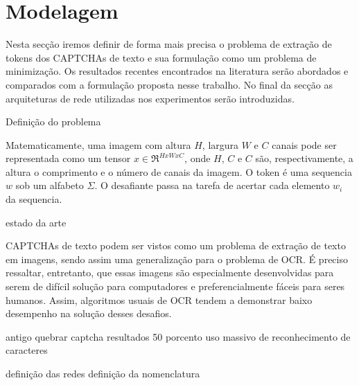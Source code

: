 \chapter{Modelagem}\label{modelagem}

Nesta secção iremos definir de forma mais precisa o problema de extração de tokens dos CAPTCHAs de texto e sua formulação como um problema de minimização. Os resultados recentes encontrados na literatura serão abordados e comparados com a formulação proposta nesse trabalho. No final da secção as arquiteturas de rede utilizadas nos experimentos serão introduzidas.


Definição do problema

Matematicamente, uma imagem com altura $H$, largura $W$ e $C$ canais pode ser representada como um tensor $x \in \Re^{H x W x C}$, onde $H$, $C$  e $C$ são, respectivamente, a altura o comprimento e o número de canais da imagem. O token é uma sequencia $w$ sob um alfabeto $\Sigma$. O desafiante passa na tarefa de acertar cada elemento $w_i$ da sequencia.

estado da arte

CAPTCHAs de texto\cite{captcha_review_2017} podem ser vistos como um problema de extração de texto em imagens, sendo assim uma generalização para o problema de OCR. É preciso ressaltar, entretanto, que essas imagens são especialmente desenvolvidas para serem de difícil solução para computadores e preferencialmente fáceis para seres humanos. Assim, algoritmos usuais de OCR tendem a demonstrar baixo desempenho na solução desses desafios.


antigo quebrar captcha \cite{lectures2005HIP} resultados 50 porcento
uso massivo de reconhecimento de caracteres



definição das redes
definição da nomenclatura


